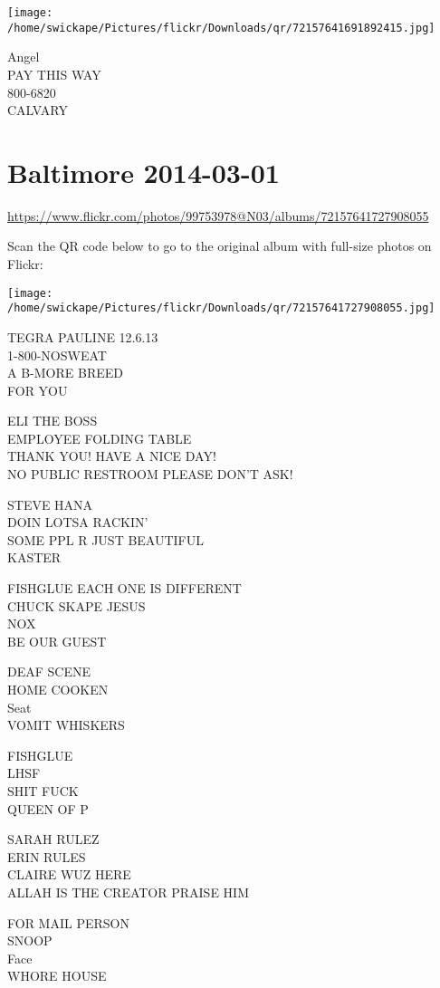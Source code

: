 \documentclass[10pt,letterpaper]{article}
\begin{document}
\texttt{[image: /home/swickape/Pictures/flickr/Downloads/qr/72157641691892415.jpg]}


Angel\\
PAY THIS WAY\\
800{-}6820\\
CALVARY


\section*{Baltimore 2014-03-01}

\url{https://www.flickr.com/photos/99753978@N03/albums/72157641727908055}

Scan the QR code below to go to the original album with full-size photos on Flickr:

\texttt{[image: /home/swickape/Pictures/flickr/Downloads/qr/72157641727908055.jpg]}


TEGRA PAULINE 12.6.13\\
1{-}800{-}NOSWEAT\\
A B{-}MORE BREED\\
FOR YOU

ELI THE BOSS\\
EMPLOYEE FOLDING TABLE\\
THANK YOU!  HAVE A NICE DAY!\\
NO PUBLIC RESTROOM PLEASE DON'T ASK!

STEVE HANA\\
DOIN LOTSA RACKIN'\\
SOME PPL R JUST BEAUTIFUL\\
KASTER

FISHGLUE EACH ONE IS DIFFERENT\\
CHUCK SKAPE JESUS\\
NOX\\
BE OUR GUEST

DEAF SCENE\\
HOME COOKEN\\
Seat\\
VOMIT WHISKERS

FISHGLUE\\
LHSF\\
SHIT FUCK\\
QUEEN OF P

SARAH RULEZ\\
ERIN RULES\\
CLAIRE WUZ HERE\\
ALLAH IS THE CREATOR PRAISE HIM

FOR MAIL PERSON\\
SNOOP\\
Face\\
WHORE HOUSE
\end{document}
